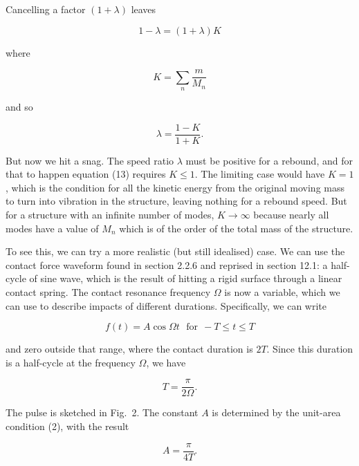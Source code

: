   Cancelling a factor $(1+ \lambda)$ leaves 

  \begin{equation*}1-\lambda = (1+\lambda)K \tag{11}\end{equation*} 

  \noindent{}where 

  \begin{equation*}K=\sum_n{\dfrac{m}{M_n}} \tag{12}\end{equation*} 

  \noindent{}and so 

  \begin{equation*}\lambda = \dfrac{1-K}{1+K}. \tag{13}\end{equation*} 

  But now we hit a snag. The speed ratio $\lambda$ must be positive for a 
  rebound, and for that to happen equation (13) requires $K \le 1$. The 
  limiting case would have $K=1$, which is the condition for all the kinetic 
  energy from the original moving mass to turn into vibration in the structure, 
  leaving nothing for a rebound speed. But for a structure with an infinite 
  number of modes, $K \rightarrow \infty$ because nearly all modes have a value 
  of $M_n$ which is of the order of the total mass of the structure. 

  To see this, we can try a more realistic (but still idealised) case. We can 
  use the contact force waveform found in section 2.2.6 and reprised in section 
  12.1: a half-cycle of sine wave, which is the result of hitting a rigid 
  surface through a linear contact spring. The contact resonance frequency 
  $\Omega$ is now a variable, which we can use to describe impacts of different 
  durations. Specifically, we can write 

  \begin{equation*}f(t)=A \cos \Omega t \mathrm{~~~for~~} -T \le t \le T 
  \tag{14}\end{equation*} 

  \noindent{}and zero outside that range, where the contact duration is $2T$. 
  Since this duration is a half-cycle at the frequency $\Omega$, we have 

  \begin{equation*}T=\dfrac{\pi}{2 \Omega}. \tag{15}\end{equation*} 

  The pulse is sketched in Fig.\ 2. The constant $A$ is determined by the 
  unit-area condition (2), with the result 

  \begin{equation*}A=\dfrac{\pi}{4T}. \tag{16}\end{equation*} 

